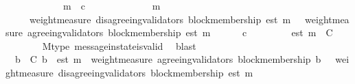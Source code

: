 \begin{isabellebody}
\ \ \isamarkupfalse%
\ {\isacharminus}\ \isanewline
\ \ \ \ \isamarkupfalse%
\ {\isasymsigma}\ m\ {\isasymsigma}{\isacharprime}\ c\isanewline
\ \ \ \ \isamarkupfalse%
\ {\isachardoublequoteopen}{\isasymsigma}\ {\isasymin}\ {\isasymSigma}{\isachardoublequoteclose}\isanewline
\ \ \ \ \ {\isachardoublequoteopen}m\ {\isasymin}\ {\isasymsigma}{\isachardoublequoteclose}\isanewline
\ \ \ \ \ {\isachardoublequoteopen}{\isasymsigma}{\isacharprime}\ {\isasymin}\ {\isasymSigma}{\isachardoublequoteclose}\isanewline
\ \ \ \ \ {\isachardoublequoteopen}{\isasymsigma}\ {\isasymsubseteq}\ {\isasymsigma}{\isacharprime}{\isachardoublequoteclose}\isanewline
\ \ \ \ \ {\isachardoublequoteopen}weight{\isacharunderscore}measure\ {\isacharparenleft}disagreeing{\isacharunderscore}validators\ {\isacharparenleft}block{\isacharunderscore}membership\ {\isacharparenleft}est\ m{\isacharparenright}{\isacharcomma}\ {\isasymsigma}{\isacharprime}{\isacharparenright}{\isacharparenright}\ {\isacharless}\ weight{\isacharunderscore}measure\ {\isacharparenleft}agreeing{\isacharunderscore}validators\ {\isacharparenleft}block{\isacharunderscore}membership\ {\isacharparenleft}est\ m{\isacharparenright}{\isacharcomma}\ {\isasymsigma}{\isacharprime}{\isacharparenright}{\isacharparenright}{\isachardoublequoteclose}\isanewline
\ \ \ \ \ {\isachardoublequoteopen}c\ {\isasymin}\ {\isasymepsilon}\ {\isasymsigma}{\isacharprime}{\isachardoublequoteclose}\isanewline
\ \ \ \ \isamarkupfalse%
\ {\isachardoublequoteopen}est\ m\ {\isasymin}\ C{\isachardoublequoteclose}\isanewline
\ \ \ \ \ \ \isamarkupfalse%
\ M{\isacharunderscore}type\ message{\isacharunderscore}in{\isacharunderscore}state{\isacharunderscore}is{\isacharunderscore}valid\ \isamarkupfalse%
\ blast\isanewline
\ \ \ \ \isamarkupfalse%
\ {\isachardoublequoteopen}{\isasymforall}\ b{\isacharprime}\ {\isasymin}\ C{\isachardot}\ b{\isacharprime}\ {\isasymdownharpoonright}\ est\ m\ {\isasymlongrightarrow}\ weight{\isacharunderscore}measure\ {\isacharparenleft}agreeing{\isacharunderscore}validators\ {\isacharparenleft}block{\isacharunderscore}membership\ b{\isacharprime}{\isacharcomma}\ {\isasymsigma}{\isacharprime}{\isacharparenright}{\isacharparenright}\ {\isachargreater}\ weight{\isacharunderscore}measure\ {\isacharparenleft}disagreeing{\isacharunderscore}validators\ {\isacharparenleft}block{\isacharunderscore}membership\ {\isacharparenleft}est\ m{\isacharparenright}{\isacharcomma}\ {\isasymsigma}{\isacharprime}{\isacharparenright}{\isacharparenright}{\isachardoublequoteclose}\isanewline

\end{isabellebody}
